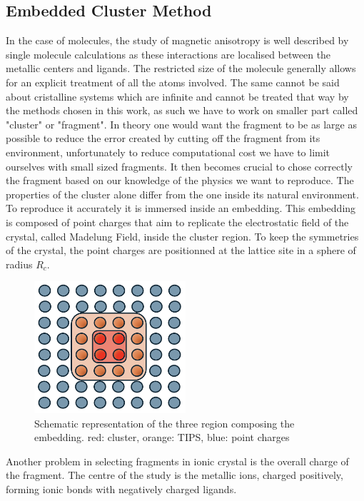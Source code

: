 \documentclass[10pt]{report}
\numberwithin{equation}{section}
\begin{document}
\subsection{Embedded Cluster Method}

In the case of molecules, the study of magnetic anisotropy is well described by single molecule calculations as these interactions are localised between the metallic centers and ligands. 
The restricted size of the molecule generally allows for an explicit treatment of all the atoms involved.
The same cannot be said about cristalline systems which are infinite and cannot be treated that way by the methods chosen in this work, as such we have to work on smaller part called "cluster" or "fragment".
In theory one would want the fragment to be as large as possible to reduce the error created by cutting off the fragment from its environment, unfortunately to reduce computational cost we have to limit ourselves with small sized fragments. 
It then becomes crucial to chose correctly the fragment based on our knowledge of the physics we want to reproduce.
The properties of the cluster alone differ from the one inside its natural environment. To reproduce it accurately it is immersed inside an embedding. 
This embedding is composed of point charges that aim to replicate the electrostatic field of the crystal, called Madelung Field, inside the cluster region. 
To keep the symmetries of the crystal, the point charges are positionned at the lattice site in a sphere of radius $R_c$. 
\begin{figure}[h!]
    \centering
    \includegraphics[width=0.5\textwidth]{Images/Bain.png}
    \caption{Schematic representation of the three region composing the embedding. red: cluster, orange: TIPS, blue: point charges}
    \label{Bain}
\end{figure}
Another problem in selecting fragments in ionic crystal is the overall charge of the fragment.
The centre of the study is the metallic ions, charged positively, forming ionic bonds with negatively charged ligands.
\end{document}
